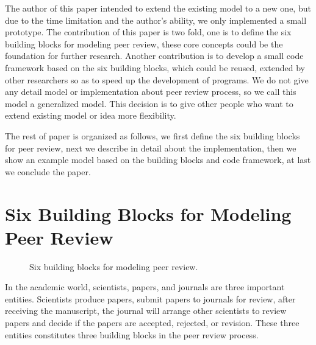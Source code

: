 \documentclass[11pt]{article}
\begin{document}
The author of this paper intended to extend the existing model to a new one, but due to the time limitation and the author's ability, we only implemented a small prototype. The contribution of this paper is two fold, one is to define the six building blocks for modeling peer review, these core concepts could be the foundation for further research. Another contribution is to develop a small code framework based on the six building blocks, which could be reused, extended by other researchers so as to speed up the development of programs. We do not give any detail model or implementation about peer review process, so we call this model a generalized model. This decision is to give other people who want to extend existing model or idea more flexibility.

The rest of paper is organized as follows, we first define the six building blocks for peer review, next we describe in detail about the implementation, then we show an example model based on the building blocks and code framework, at last we conclude the paper.

\section{Six Building Blocks for Modeling Peer Review}

\begin{figure}[!th]
\caption{Six building blocks for modeling peer review.}
\label{fig:sbb}
\end{figure}

In the academic world, scientists, papers, and journals are three important entities. Scientists produce papers, submit papers to journals for review, after receiving the manuscript, the journal will arrange other scientists to review papers and decide if the papers are accepted, rejected, or revision. These three entities constitutes three building blocks in the peer review process.
\end{document}
